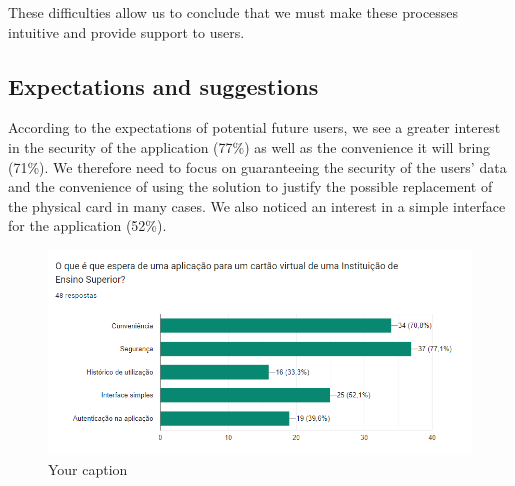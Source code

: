 \documentclass{article}
\begin{document}
These difficulties allow us to conclude that we must make these processes intuitive and provide support to users.



\subsection{Expectations and suggestions}

According to the expectations of potential future users, we see a greater interest in the security of the application (77\%) as well as the convenience it will bring (71\%). We therefore need to focus on guaranteeing the security of the users' data and the convenience of using the solution to justify the possible replacement of the physical card in many cases.
We also noticed an interest in a simple interface for the application (52\%).

\begin{figure}[h]
    \centering
    \includegraphics[width=1\textwidth]{images/questionaire4.png}
    \caption{Your caption}
\end{figure}
\end{document}
